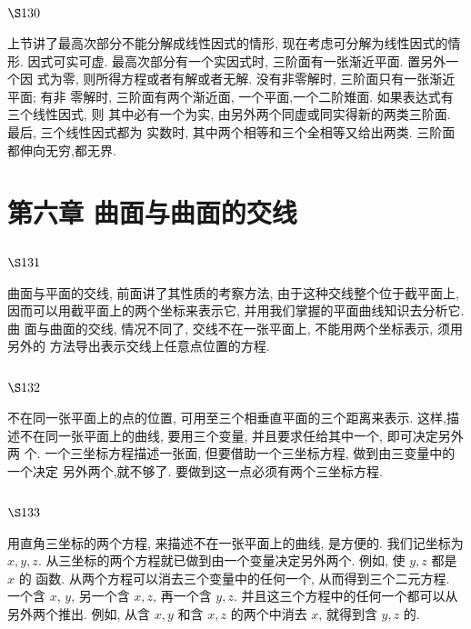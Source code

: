 \section{$\S 130$}

上节讲了最高次部分不能分解成线性因式的情形, 现在考虑可分解为线性因式的情 形. 因式可实可虚. 最高次部分有一个实因式时, 三阶面有一张渐近平面. 置另外一个因 式为零, 则所得方程或者有解或者无解. 没有非零解时, 三阶面只有一张渐近平面; 有非 零解时, 三阶面有两个渐近面, 一个平面,一个二阶雉面. 如果表达式有三个线性因式, 则 其中必有一个为实, 由另外两个同虚或同实得新的两类三阶面. 最后, 三个线性因式都为 实数时, 其中两个相等和三个全相等又给出两类. 三阶面都伸向无穷,都无界. 

\chapter{第六章 曲面与曲面的交线}

\section{$\S 131$}

曲面与平面的交线, 前面讲了其性质的考察方法, 由于这种交线整个位于截平面上, 因而可以用截平面上的两个坐标来表示它, 并用我们掌握的平面曲线知识去分析它. 曲 面与曲面的交线, 情况不同了, 交线不在一张平面上, 不能用两个坐标表示, 须用另外的 方法导出表示交线上任意点位置的方程.

\section{$\S 132$}

不在同一张平面上的点的位置, 可用至三个相垂直平面的三个距离来表示. 这样,描 述不在同一张平面上的曲线, 要用三个变量, 并且要求任给其中一个, 即可决定另外两 个. 一个三坐标方程描述一张面, 但要借助一个三坐标方程, 做到由三变量中的一个决定 另外两个,就不够了. 要做到这一点必须有两个三坐标方程.

\section{$\S 133$}

用直角三坐标的两个方程, 来描述不在一张平面上的曲线, 是方便的. 我们记坐标为 $x, y, z$. 从三坐标的两个方程就已做到由一个变量决定另外两个. 例如, 使 $y, z$ 都是 $x$ 的 函数. 从两个方程可以消去三个变量中的任何一个, 从而得到三个二元方程. 一个含 $x$, $y$, 另一个含 $x, z$, 再一个含 $y, z$. 并且这三个方程中的任何一个都可以从另外两个推出. 例如, 从含 $x, y$ 和含 $x, z$ 的两个中消去 $x$, 就得到含 $y, z$ 的.

